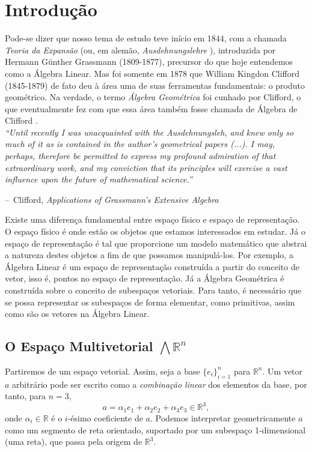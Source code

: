 \documentclass[11pt]{article}
\makeatletter
\newenvironment{chapquote}[2][2em]
{\setlength{\@tempdima}{#1}%
	\def\chapquote@author{#2}%
	\parshape 1 \@tempdima \dimexpr\textwidth-2\@tempdima\relax%
	\itshape}
{\par\normalfont\hfill--\ \chapquote@author\hspace*{\@tempdima}\par\bigskip}
\makeatother
\begin{document}
\tableofcontents

\section{Introdução}

Pode-se dizer que nosso tema de estudo teve início em 1844, com a chamada \textit{Teoria da Expansão} (ou, em alemão, \textit{Ausdehnungslehre} \cite{grassmannLineale}), introduzida por Hermann Günther Grassmann (1809-1877), precursor do que hoje entendemos como a Álgebra Linear. Mas foi somente em 1878 que William Kingdon Clifford (1845-1879) de fato deu à área uma de suas ferramentas fundamentais: o produto geométrico. Na verdade, o termo \textit{Álgebra Geométrica} foi cunhado por Clifford, o que eventualmente fez com que essa área também fosse chamada de Álgebra de Clifford \cite{sommerGeometric}. 
\\


\begin{chapquote}{Clifford, \textit{Applications of Grassmann's Extensive Algebra} \cite{cliffordApplicationsGrassmannAlgebras}}
	``Until recently I was unacquainted with the Ausdehnungsleh, and knew only so much of it as is contained in the author's geometrical papers (...). I may, perhaps, therefore be permitted to express my profound admiration of that extraordinary work, and my conviction that its principles will exercise a vast influence upon the future of mathematical science.''
\end{chapquote}


Existe uma diferença fundamental entre espaço físico e espaço de representação. O espaço físico é onde estão os objetos que estamos interessados em estudar. Já o espaço de representação é tal que proporcione um modelo matemático que abstrai a natureza destes objetos a fim de que possamos manipulá-los. Por exemplo, a Álgebra Linear é um espaço de representação construída a partir do conceito de vetor, isso é, pontos no espaço de representação. Já a Álgebra Geométrica é construída sobre o conceito de subespaços vetoriais. Para tanto, é necessário que se possa representar os subespaços de forma elementar, como primitivas, assim como são os vetores na Álgebra Linear.

\subsection{O Espaço Multivetorial $\bigwedge\mathbb{R}^n$}

Partiremos de um espaço vetorial. Assim, seja a base $\{e_i\}^n_{i=1}$ para $\mathbb{R}^n$. Um vetor $a$ arbitrário pode ser escrito como a \textit{combinação linear} dos elementos da base, por tanto, para $n=3$, $$a = \alpha_1e_1 + \alpha_2e_2 + \alpha_3e_3\in \mathbb{R}^3,$$
onde $\alpha_i\in \mathbb{R}$ é o $i$-ésimo coeficiente de $a$. Podemos interpretar geometricamente $a$ como um segmento de reta orientado, suportado por um subespaço 1-dimensional (uma reta), que passa pela origem de $\mathbb{R}^3$.
\end{document}
